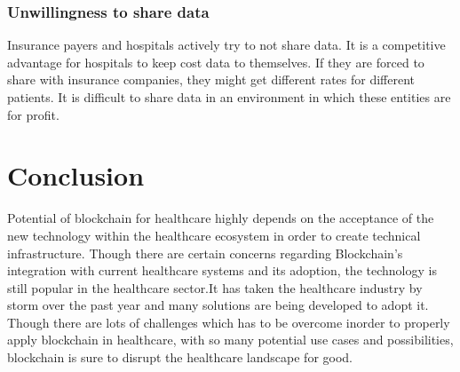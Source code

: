 \documentclass[12pt]{report}
\begin{document}
\subsection{Unwillingness to share data}
Insurance payers and hospitals actively try to not share data. It is a competitive advantage for hospitals to keep cost data to themselves. If they are forced to share with insurance companies, they might get different rates for different patients. It is difficult to share data in an environment in which these entities are for profit.





\chapter{Conclusion}
Potential of blockchain for healthcare highly depends on the acceptance of the new technology within the healthcare ecosystem in order to create technical infrastructure. Though there are certain concerns regarding Blockchain’s integration with current healthcare systems and its adoption, the technology is still popular in the healthcare sector.It has taken the healthcare industry by storm over the past year and many solutions are being developed to adopt it. Though there are lots of challenges which has to be overcome inorder to properly apply blockchain in healthcare, with so many potential use cases and possibilities, blockchain is sure to disrupt the healthcare landscape for good.


\end{document}
